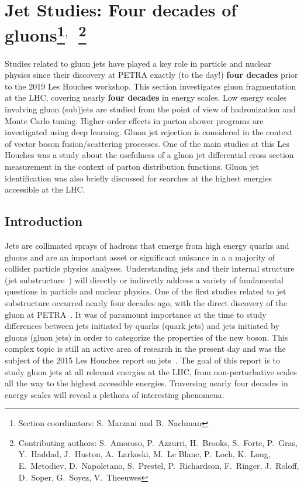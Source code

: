 \documentclass[11pt]{cernrep}
\begin{document}
\section{Jet Studies: Four decades of gluons\protect\footnote{Section coordinators: S.~Marzani and B.~Nachman}$^{,}$~\protect\footnote{Contributing authors: S.~Amoroso, P.~Azzurri, H.~Brooks, S.~Forte, P.~Gras, Y.~Haddad, J.~Huston, A.~Larkoski, M.~Le Blanc, P.~Loch, K.~Long, E.~Metodiev, D.~Napoletano, S.~Prestel, P.~Richardson, F.~Ringer, J.~Roloff, D.~Soper, G.~Soyez, V.~Theeuwes}}

Studies related to gluon jets have played a key role in particle and nuclear physics since their discovery at PETRA exactly (to the day!) \textbf{four decades} prior to the 2019 Les Houches workshop.  This section investigates gluon fragmentation at the LHC, covering nearly \textbf{four decades} in energy scales.  Low energy scales involving gluon (sub)jets are studied from the point of view of hadronization and Monte Carlo tuning.  Higher-order effects in parton shower programs are investigated using deep learning.  Gluon jet rejection is considered in the context of vector boson fusion/scattering processes.  One of the main studies at this Les Houches was a study about the usefulness of a gluon jet differential cross section measurement in the context of parton distribution functions.  Gluon jet identification was also briefly discussed for searches at the highest energies accessible at the LHC.

\subsection{Introduction}
\label{sec:jets:intro}

Jets are collimated sprays of hadrons that emerge from high energy quarks and gluons and are an important asset or significant nuisance in a a majority of collider particle physics analyses.  Understanding jets and their internal structure (jet substructure~\cite{Abdesselam:2010pt,Altheimer:2012mn,Altheimer:2013yza,Adams:2015hiv,Asquith:2018igt,Larkoski:2017jix}) will directly or indirectly address a variety of fundamental questions in particle and nuclear physics.  One of the first studies related to jet substructure occurred nearly four decades ago, with the direct discovery of the gluon at PETRA~\cite{Brandelik:1979bd,Barber:1979yr,Berger:1979cj,Bartel:1979ut,Ellis:2014rma}.  It was of paramount importance at the time to study differences between jets initiated by quarks (quark jets) and jets initiated by gluons (gluon jets) in order to categorize the properties of the new boson.  This complex topic is still an active area of research in the present day and was the subject of the 2015 Les Houches report on jets~\cite{Badger:2016bpw,Gras:2017jty}.   The goal of this report is to study gluon jets at all relevant energies at the LHC, from non-perturbative scales all the way to the highest accessible energies.   Traversing nearly four decades in energy scales will reveal a plethora of interesting phenomena.  
\end{document}
